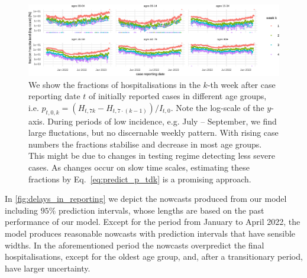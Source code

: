 \begin{figure}

    {\centering \includegraphics[width=\textwidth]{figures_tentative/hospitalisation_probabilities_over_time-1} 

}

\caption{We show the fractions of hospitalisations in the $k$-th week after case reporting date $t$  of initially reported cases in different age groups, i.e. $p_{t,0,k} = \left(H_{t,7 k} - H_{t, 7 \cdot (k - 1)}\right) / I_{t,0} $. Note the log-scale of the $y$-axis. During periods of low incidence, e.g. July -- September, we find large fluctations, but no discernable weekly pattern. With rising case numbers the fractions stabilise and decrease in most age groups. This might be due to changes in testing regime detecting less severe cases. As changes occur on slow time scales, estimating these fractions by Eq.~\eqref{eq:predict_p_tdk} is a promising approach.}\label{fig:hospitalisation_probabilities_over_time}
\end{figure}

In \cref{fig:delays_in_reporting} we depict the nowcasts produced
from our model including \(95\%\) prediction intervals, whose lengths
are based on the past performance of our model. Except for the period
from January to April 2022, the model produces reasonable nowcasts with
prediction intervals that have sensible widths. In the aforementioned
period the nowcasts overpredict the final hospitalisations, except for
the oldest age group, and, after a transitionary period, have larger
uncertainty.

